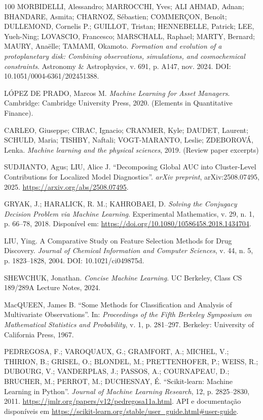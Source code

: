 \documentclass[msc]{on} %
\begin{document}
\begin{thebibliography}{100}
 MORBIDELLI, Alessandro; MARROCCHI, Yves; ALI AHMAD, Adnan; BHANDARE, Asmita; CHARNOZ, S\'ebastien; COMMER\c{C}ON, Beno\^it; DULLEMOND, Cornelis P.; GUILLOT, Tristan; HENNEBELLE, Patrick; LEE, Yueh-Ning; LOVASCIO, Francesco; MARSCHALL, Raphael; MARTY, Bernard; MAURY, Ana\"elle; TAMAMI, Okamoto. \textit{Formation and evolution of a protoplanetary disk: Combining observations, simulations, and cosmochemical constraints}. Astronomy \& Astrophysics, v. 691, p. A147, nov. 2024. DOI: 10.1051/0004-6361/202451388.

 LÓPEZ DE PRADO, Marcos M. \textit{Machine Learning for Asset Managers}. Cambridge: Cambridge University Press, 2020. (Elements in Quantitative Finance).

 CARLEO, Giuseppe; CIRAC, Ignacio; CRANMER, Kyle; DAUDET, Laurent; SCHULD, Maria; TISHBY, Naftali; VOGT-MARANTO, Leslie; ZDEBOROVÁ, Lenka. \textit{Machine learning and the physical sciences}, 2019. (Review paper excerpts)

 SUDJIANTO, Agus; LIU, Alice J. ``Decomposing Global AUC into Cluster-Level Contributions for Localized Model Diagnostics''. \emph{arXiv preprint}, arXiv:2508.07495, 2025. \url{https://arxiv.org/abs/2508.07495}.

 GRYAK, J.; HARALICK, R. M.; KAHROBAEI, D. \textit{Solving the Conjugacy Decision Problem via Machine Learning}. Experimental Mathematics, v. 29, n. 1, p. 66--78, 2018. Disponível em: \url{https://doi.org/10.1080/10586458.2018.1434704}.

 LIU, Ying. A Comparative Study on Feature Selection Methods for Drug Discovery. \textit{Journal of Chemical Information and Computer Sciences}, v. 44, n. 5, p. 1823--1828, 2004. DOI: 10.1021/ci049875d.

 SHEWCHUK, Jonathan. \textit{Concise Machine Learning}. UC Berkeley, Class CS 189/289A Lecture Notes, 2024.

 MacQUEEN, James B. ``Some Methods for Classification and Analysis of Multivariate Observations''. In: \emph{Proceedings of the Fifth Berkeley Symposium on Mathematical Statistics and Probability}, v. 1, p. 281--297. Berkeley: University of California Press, 1967.

PEDREGOSA, F.; VAROQUAUX, G.; GRAMFORT, A.; MICHEL, V.; THIRION, B.; GRISEL, O.; BLONDEL, M.; PRETTENHOFER, P.; WEISS, R.; DUBOURG, V.; VANDERPLAS, J.; PASSOS, A.; COURNAPEAU, D.; BRUCHER, M.; PERROT, M.; DUCHESNAY, É. ``Scikit-learn: Machine Learning in Python''. \emph{Journal of Machine Learning Research}, 12, p. 2825--2830, 2011. \url{https://jmlr.org/papers/v12/pedregosa11a.html}. API e documentação disponíveis em \url{https://scikit-learn.org/stable/user_guide.html#user-guide}.


\end{thebibliography}
\end{document}
